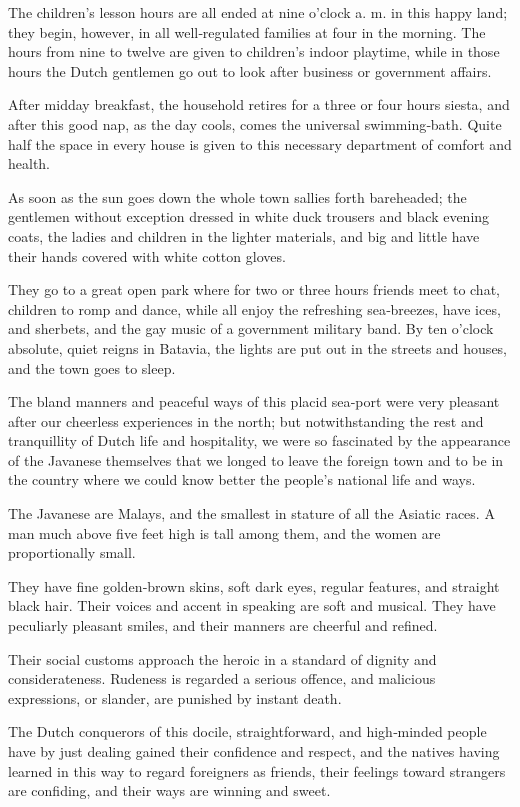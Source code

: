 \documentclass[12pt]{book}
\begin{document}
The children’s lesson hours are all ended at nine o’clock a. m. in this happy
land; they begin, however, in all well‐regulated families at four in the morning.
The hours from nine to twelve are given to children’s indoor playtime, while in
those hours the Dutch gentlemen go out to look after business or government
affairs.

After midday breakfast, the household retires for a three or four hours siesta,
and after this good nap, as the day cools, comes the universal swimming‐bath.
Quite half the space in every house is given to this necessary department of
comfort and health.

As soon as the sun goes down the whole town sallies forth bareheaded; the
gentlemen without exception dressed in white duck trousers and black evening
coats, the ladies and children in the lighter materials, and big and little have their
hands covered with white cotton gloves.

They go to a great open park where for two or three hours friends meet to
chat, children to romp and dance, while all enjoy the refreshing sea‐breezes, have
ices, and sherbets, and the gay music of a government military band. By ten
o’clock absolute, quiet reigns in Batavia, the lights are put out in the streets and
houses, and the town goes to sleep.

The bland manners and peaceful ways of this placid sea‐port were very pleasant after our cheerless experiences in the north; but notwithstanding the rest and
tranquillity of Dutch life and hospitality, we were so fascinated by the appearance
of the Javanese themselves that we longed to leave the foreign town and to be in
the country where we could know better the people’s national life and ways.

The Javanese are Malays, and the smallest in stature of all the Asiatic races. A
man much above five feet high is tall among them, and the women are proportionally small.

They have fine golden‐brown skins, soft dark eyes, regular features, and
straight black hair. Their voices and accent in speaking are soft and musical. They
have peculiarly pleasant smiles, and their manners are cheerful and refined.

Their social customs approach the heroic in a standard of dignity and considerateness. Rudeness is regarded a serious offence, and malicious expressions, or
slander, are punished by instant death.

The Dutch conquerors of this docile, straightforward, and high‐minded people
have by just dealing gained their confidence and respect, and the natives having
learned in this way to regard foreigners as friends, their feelings toward strangers
are confiding, and their ways are winning and sweet.
\end{document}
